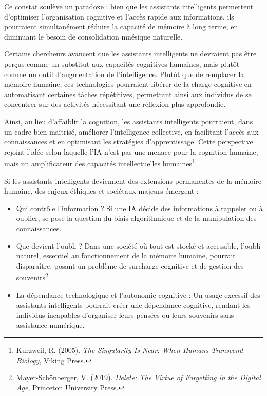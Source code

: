 \documentclass[11pt,a4paper]{report}
\begin{document}
Ce constat soulève un paradoxe : bien que les assistants intelligents permettent d’optimiser l’organisation cognitive et l’accès rapide aux informations, ils pourraient simultanément réduire la capacité de mémoire à long terme, en diminuant le besoin de consolidation mnésique naturelle.

Certains chercheurs avancent que les assistants intelligents ne devraient pas être perçus comme un substitut aux capacités cognitives humaines, mais plutôt comme un outil d’augmentation de l’intelligence. Plutôt que de remplacer la mémoire humaine, ces technologies pourraient libérer de la charge cognitive en automatisant certaines tâches répétitives, permettant ainsi aux individus de se concentrer sur des activités nécessitant une réflexion plus approfondie.

Ainsi, au lieu d’affaiblir la cognition, les assistants intelligents pourraient, dans un cadre bien maîtrisé, améliorer l’intelligence collective, en facilitant l’accès aux connaissances et en optimisant les stratégies d’apprentissage. Cette perspective rejoint l’idée selon laquelle l’IA n’est pas une menace pour la cognition humaine, mais un amplificateur des capacités intellectuelles humaines\footnote{Kurzweil, R. (2005). \textit{The Singularity Is Near: When Humans Transcend Biology}, Viking Press.}.


Si les assistants intelligents deviennent des extensions permanentes de la mémoire humaine, des enjeux éthiques et sociétaux majeurs émergent :

\begin{itemize}

    \item Qui contrôle l’information ? Si une IA décide des informations à rappeler ou à oublier, se pose la question du biais algorithmique et de la manipulation des connaissances.

    \item Que devient l’oubli ? Dans une société où tout est stocké et accessible, l’oubli naturel, essentiel au fonctionnement de la mémoire humaine, pourrait disparaître, posant un problème de surcharge cognitive et de gestion des souvenirs\footnote{Mayer-Schönberger, V. (2019). \textit{Delete: The Virtue of Forgetting in the Digital Age}, Princeton University Press.}.

    \item La dépendance technologique et l’autonomie cognitive : Un usage excessif des assistants intelligents pourrait créer une dépendance cognitive, rendant les individus incapables d’organiser leurs pensées ou leurs souvenirs sans assistance numérique.

\end{itemize}
\end{document}
